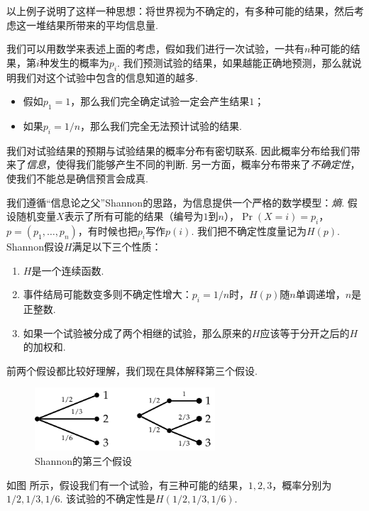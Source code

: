 以上例子说明了这样一种思想：将世界视为不确定的，有多种可能的结果，然后考虑这一堆结果所带来的平均信息量.

我们可以用数学来表述上面的考虑，假如我们进行一次试验，一共有$n$种可能的结果，第$i$种发生的概率为$p_i$. 我们预测试验的结果，如果越能正确地预测，那么就说明我们对这个试验中包含的信息知道的越多. 
\begin{itemize}
    \item 假如$p_1=1$，那么我们完全确定试验一定会产生结果$1$；
    \item 如果$p_i=1/n$，那么我们完全无法预计试验的结果.
\end{itemize}
我们对试验结果的预期与试验结果的概率分布有密切联系. 因此概率分布给我们带来了\textit{信息}，使得我们能够产生不同的判断. 另一方面，概率分布带来了\textit{不确定性}，使我们不能总是确信预言会成真. 

我们遵循“信息论之父”Shannon的思路，为信息提供一个严格的数学模型：\textit{熵}. 假设随机变量$X$表示了所有可能的结果（编号为$1$到$n$），$\Pr(X=i)=p_i$，$p=(p_1,\dots,p_n)$，有时候也把$p_i$写作$p(i)$. 我们把不确定性度量记为$H(p)$. Shannon假设$H$满足以下三个性质：
\begin{enumerate}
    \item $H$是一个连续函数.
    \item 事件结局可能数变多则不确定性增大：$p_i=1/n$时，$H(p)$随$n$单调递增，$n$是正整数.
    \item 如果一个试验被分成了两个相继的试验，那么原来的$H$应该等于分开之后的$H$的加权和.
\end{enumerate}

前两个假设都比较好理解，我们现在具体解释第三个假设.  
\begin{figure}[ht]
    \centering
    \includegraphics[width=0.6\textwidth]{figures/information-theory/decomposition-assumption.pdf}
    \caption{Shannon的第三个假设}
    \label{fig:decomposition-assumption}
\end{figure}

如图 所示，假设我们有一个试验，有三种可能的结果，$1,2,3$，概率分别为$1/2,1/3,1/6$. 该试验的不确定性是$H(1/2,1/3,1/6)$. 

